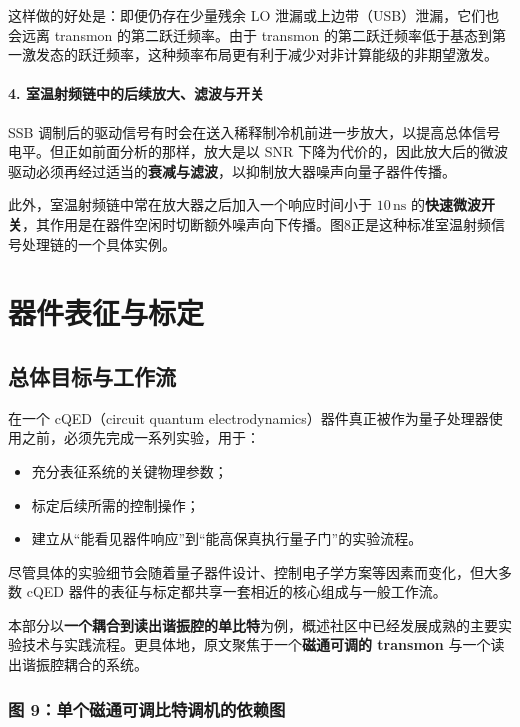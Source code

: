 \documentclass[12pt,a4paper,oneside]{ctexbook}
\begin{document}
这样做的好处是：即便仍存在少量残余 LO 泄漏或上边带（USB）泄漏，它们也会远离 transmon 的第二跃迁频率。由于 transmon 的第二跃迁频率低于基态到第一激发态的跃迁频率，这种频率布局更有利于减少对非计算能级的非期望激发。

\paragraph{4. 室温射频链中的后续放大、滤波与开关}

SSB 调制后的驱动信号有时会在送入稀释制冷机前进一步放大，以提高总体信号电平。但正如前面分析的那样，放大是以 SNR 下降为代价的，因此放大后的微波驱动必须再经过适当的\textbf{衰减与滤波}，以抑制放大器噪声向量子器件传播。

此外，室温射频链中常在放大器之后加入一个响应时间小于 $10\,\mathrm{ns}$ 的\textbf{快速微波开关}，其作用是在器件空闲时切断额外噪声向下传播。图8正是这种标准室温射频信号处理链的一个具体实例。

\section{器件表征与标定}

\subsection{总体目标与工作流}

在一个 cQED（circuit quantum electrodynamics）器件真正被作为量子处理器使用之前，必须先完成一系列实验，用于：
\begin{itemize}
    \item 充分表征系统的关键物理参数；
    \item 标定后续所需的控制操作；
    \item 建立从“能看见器件响应”到“能高保真执行量子门”的实验流程。
\end{itemize}

尽管具体的实验细节会随着量子器件设计、控制电子学方案等因素而变化，但大多数 cQED 器件的表征与标定都共享一套相近的核心组成与一般工作流。

本部分以\textbf{一个耦合到读出谐振腔的单比特}为例，概述社区中已经发展成熟的主要实验技术与实践流程。更具体地，原文聚焦于一个\textbf{磁通可调的 transmon} 与一个读出谐振腔耦合的系统。

\subsubsection{图 9：单个磁通可调比特调机的依赖图}
\end{document}

